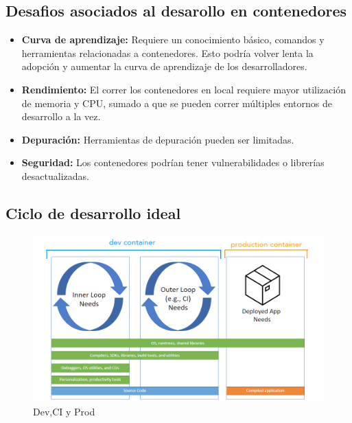 \documentclass{beamer}
\begin{document}
\subsection{Desafios asociados al desarollo en contenedores}
\begin{frame}{\subsecname}
  \begin{itemize}
    \item \textbf{Curva de aprendizaje:} Requiere un conocimiento básico, comandos y herramientas relacionadas a contenedores. Esto podría volver lenta la adopción y aumentar la curva de aprendizaje de los desarrolladores.
    \item \textbf{Rendimiento:} El correr los contenedores en local requiere mayor utilización de memoria y CPU, sumado a que se pueden correr múltiples entornos de desarrollo a la vez.
    \item \textbf{Depuración:} Herramientas de depuración pueden ser limitadas.
    \item \textbf{Seguridad:} Los contenedores podrían tener vulnerabilidades o librerías desactualizadas.
  \end{itemize}
\end{frame}
\subsection{Ciclo de desarrollo ideal}
\begin{frame}{\subsecname}
  \begin{figure}
    \centering
    \includegraphics[width=\textwidth]{images/dev-container-stages.png}
    \caption{Dev,CI y Prod}
  \end{figure}
\end{frame}
\end{document}
